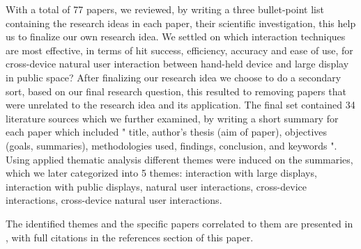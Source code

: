 With a total of 77 papers, we reviewed, by writing a three bullet-point list containing the research ideas in each paper, their scientific investigation, this help us to finalize our own  research idea. We settled on which interaction techniques are most effective, in terms of hit success, efficiency, accuracy and ease of use, for cross-device natural user interaction between hand-held device and large display in public space? After finalizing our research idea we choose to do a secondary sort, based on our final research question, this resulted to removing papers that were unrelated to the research idea and its application.
The final set contained 34 literature sources which we further examined, by writing a short summary for each paper which included " title, author's thesis (aim of paper), objectives (goals, summaries), methodologies used, findings, conclusion, and keywords ". 
Using applied thematic analysis different themes were induced on the summaries, which we later categorized into 5 themes: interaction with large displays, interaction with public displays, natural user interactions, cross-device interactions, cross-device natural user interactions.


The identified themes and the specific papers correlated to them are presented in , with full citations in the references section of this paper. 

